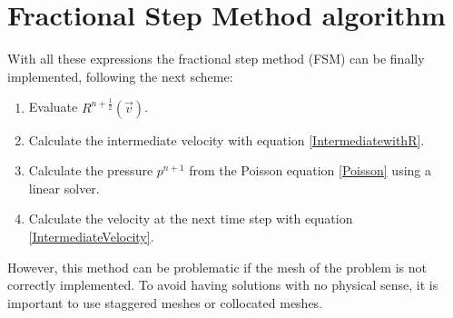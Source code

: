 \section{Fractional Step Method algorithm}
With all these expressions the fractional step method (FSM) can be finally implemented, following the next scheme:
\begin{enumerate}
	\item Evaluate $R^{n+\frac{1}{2}}\left(\vec{v}\right)$.
	\item Calculate the intermediate velocity with equation \ref{IntermediatewithR}.
	\item Calculate the pressure $p^{n+1}$ from the Poisson equation \ref{Poisson} using a linear solver.
	\item Calculate the velocity at the next time step with equation \ref{IntermediateVelocity}.
\end{enumerate}
However, this method can be problematic if the mesh of the problem is not correctly implemented. To avoid having solutions with no physical sense, it is important to use staggered meshes or collocated meshes.

